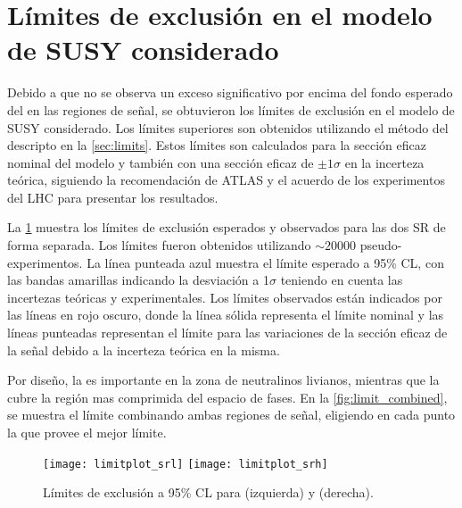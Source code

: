 

\section{Límites de exclusión en el modelo de SUSY considerado}

Debido a que no se observa un exceso significativo por encima del fondo esperado
del {\SM} en las regiones de señal, se obtuvieron los límites de exclusión en el
modelo de SUSY considerado. Los límites superiores son obtenidos utilizando el
método del {\cls} descripto en la \cref{sec:limits}. Estos límites son
calculados para la sección eficaz nominal del modelo y también con una sección
eficaz de $\pm 1 \sigma$ en la incerteza teórica, siguiendo la recomendación de
ATLAS y el acuerdo de los experimentos del LHC para presentar los resultados.

La \cref{fig:limit_srs} muestra los límites de exclusión esperados y
observados para las dos SR de forma separada. Los límites fueron obtenidos
utilizando $\sim 20000$ pseudo-experimentos. La línea punteada azul muestra el
límite esperado a 95\% CL, con las bandas amarillas indicando la desviación a
1$\sigma$ teniendo en cuenta las incertezas teóricas y experimentales. Los
límites observados están indicados por las líneas en rojo oscuro, donde la línea
sólida representa el límite nominal y las líneas punteadas representan el límite
para las variaciones de la sección eficaz de la señal debido a la incerteza
teórica en la misma.

Por diseño, la {\SRL} es importante en la zona de neutralinos livianos, mientras que
la {\SRH} cubre la región mas comprimida del espacio de fases. En la
\cref{fig:limit_combined}, se muestra el límite combinando ambas
regiones de señal, eligiendo en cada punto la que provee el mejor límite.


\begin{figure}[!htbp]
  \centering

  \texttt{[image: limitplot\_srl]}
  \texttt{[image: limitplot\_srh]}

  \caption{Límites de exclusión a 95\% CL para {\SRL}  (izquierda) y {\SRH} (derecha).}
  \label{fig:limit_srs}
\end{figure}


